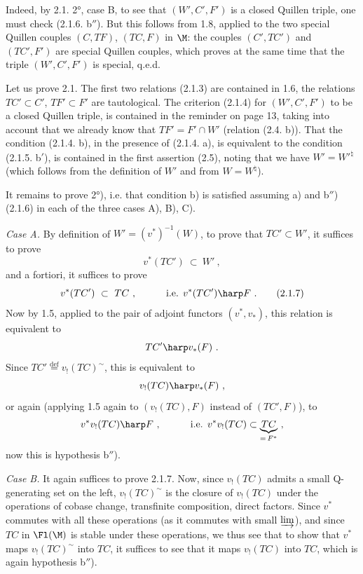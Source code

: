 
Indeed, by 2.1. 2°, case B, to see that $(W',C',F')$ is a closed Quillen triple, one must check (2.1.6. b$''$). But this follows from 1.8, applied to the two special Quillen couples $(C,TF)$, $(TC,F)$ in $\M$: the couples $(C',TC')$ and $(TC',F')$ are special Quillen couples, which proves at the same time that the triple $(W',C',F')$ is special, q.e.d. %

Let us prove 2.1. The first two relations (2.1.3) are contained in 1.6, the relations $TC' \subset C'$, $TF' \subset F'$ are tautological. The criterion (2.1.4) for $(W',C',F')$ to be a closed Quillen triple, is contained in the reminder on page 13, taking into account that we already know that $TF' = F' \cap W'$ (relation (2.4. b)). That the condition (2.1.4. b), in the presence of (2.1.4. a), is equivalent to the condition (2.1.5. b$'$), is contained in the first assertion (2.5), noting that we have $W' = W'^{\natural}$ (which follows from the definition of $W'$ and from $W = W^{\natural}$).

It remains to prove 2°), i.e. that condition b) is satisfied assuming a) and b$''$) (2.1.6) in each of the three cases A), B), C).

\textit{Case A.} By definition of $W' = (v^*)^{-1}(W)$, to prove that $TC' \subset W'$, it suffices to prove
\[
v^*(TC')\ \subset\ W'\ ,  %
\]
and a fortiori, it suffices to prove
\[
v^*(TC')\ \subset\ TC\ ,\qquad\quad \text{i.e. } v^*(TC') \harp F\ .
\tag*{(2.1.7)} %
\]
Now by 1.5, applied to the pair of
adjoint functors $(v^*,v_*)$, this relation is equivalent to
\[
TC' \harp v_*(F)\ .
\]
Since $TC' \overset{\text{def}}{=} v_!(TC)^{\sim}$, this is equivalent to
\[
v_!(TC) \harp v_*(F)\ ,
\]
or again (applying 1.5 again to $(v_!(TC),F)$ instead of $(TC',F)$), to
\[
v^*v_!(TC) \harp F\ ,\qquad\quad \text{i.e. } v^*v_!(TC) \subset \underbrace{TC}_{=\,F^*}\ ,
\]
now this is hypothesis b$''$).

\textit{Case B.} It again suffices to prove 2.1.7. Now, since $v_!(TC)$ admits a small Q-generating set on the left, $v_!(TC)^{\sim}$ is the closure of $v_!(TC)$ under the operations of cobase change, transfinite composition, direct factors. Since $v^*$ commutes with all these operations (as it commutes with small $\varinjlim$), and since $TC$ in $\Fl(\M)$ is stable under these operations, we thus see that to show that $v^*$ maps $v_!(TC)^{\sim}$ into $TC$, it suffices to see that it maps $v_!(TC)$ into $TC$, which is again hypothesis b$''$).


